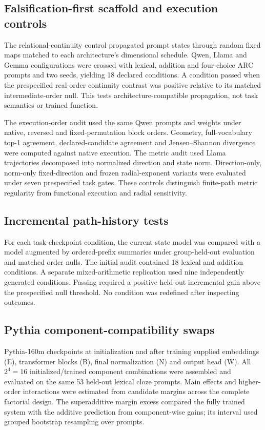 \documentclass[11pt]{article}
\begin{document}
\subsection*{Falsification-first scaffold and execution controls}
The relational-continuity control propagated prompt states through random fixed maps matched to each architecture's dimensional schedule. Qwen, Llama and Gemma configurations were crossed with lexical, addition and four-choice ARC prompts and two seeds, yielding 18 declared conditions. A condition passed when the prespecified real-order continuity contrast was positive relative to its matched intermediate-order null. This tests architecture-compatible propagation, not task semantics or trained function.

The execution-order audit used the same Qwen prompts and weights under native, reversed and fixed-permutation block orders. Geometry, full-vocabulary top-1 agreement, declared-candidate agreement and Jensen--Shannon divergence were computed against native execution. The metric audit used Llama trajectories decomposed into normalized direction and state norm. Direction-only, norm-only fixed-direction and frozen radial-exponent variants were evaluated under seven prespecified task gates. These controls distinguish finite-path metric regularity from functional execution and radial sensitivity.

\subsection*{Incremental path-history tests}
For each task-checkpoint condition, the current-state model was compared with a model augmented by ordered-prefix summaries under group-held-out evaluation and matched order nulls. The initial audit contained 18 lexical and addition conditions. A separate mixed-arithmetic replication used nine independently generated conditions. Passing required a positive held-out incremental gain above the prespecified null threshold. No condition was redefined after inspecting outcomes.

\subsection*{Pythia component-compatibility swaps}
Pythia-160m checkpoints at initialization and after training supplied embeddings (E), transformer blocks (B), final normalization (N) and output head (W). All $2^4=16$ initialized/trained component combinations were assembled and evaluated on the same 53 held-out lexical cloze prompts. Main effects and higher-order interactions were estimated from candidate margins across the complete factorial design. The superadditive margin excess compared the fully trained system with the additive prediction from component-wise gains; its interval used grouped bootstrap resampling over prompts.
\end{document}
